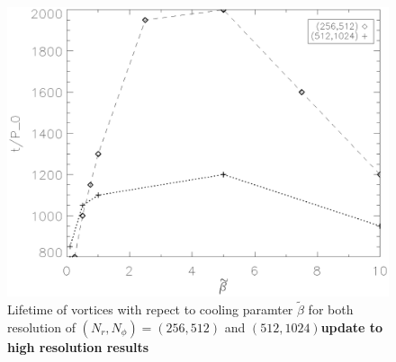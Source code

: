 



\begin{figure}
    \includegraphics[width=\linewidth]{figures/betaplot}
 \caption{Lifetime of vortices with repect to cooling paramter $\tilde\beta$ for both resolution of $(N_r,N_\phi)=(256,512)$ and $(512,1024)${\bf update to high resolution results} } \label{betaplot}
\end{figure}

